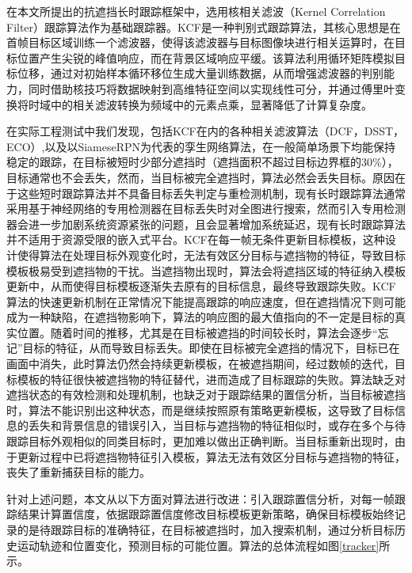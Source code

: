 
在本文所提出的抗遮挡长时跟踪框架中，选用核相关滤波（Kernel Correlation Filter）跟踪算法作为基础跟踪器。KCF是一种判别式跟踪算法，其核心思想是在首帧目标区域训练一个滤波器，使得该滤波器与目标图像块进行相关运算时，在目标位置产生尖锐的峰值响应，而在背景区域响应平缓。该算法利用循环矩阵模拟目标位移，通过对初始样本循环移位生成大量训练数据，从而增强滤波器的判别能力，同时借助核技巧将数据映射到高维特征空间以实现线性可分，并通过傅里叶变换将时域中的相关滤波转换为频域中的元素点乘，显著降低了计算复杂度。

在实际工程测试中我们发现，包括KCF在内的各种相关滤波算法（DCF，DSST，ECO）,以及以SiameseRPN为代表的孪生网络算法，在一般简单场景下均能保持稳定的跟踪，在目标被短时少部分遮挡时（遮挡面积不超过目标边界框的30\%），目标通常也不会丢失，然而，当目标被完全遮挡时，算法必然会丢失目标。原因在于这些短时跟踪算法并不具备目标丢失判定与重检测机制，现有长时跟踪算法通常采用基于神经网络的专用检测器在目标丢失时对全图进行搜索，然而引入专用检测器会进一步加剧系统资源紧张的问题，且会显著增加系统延迟，现有长时跟踪算法并不适用于资源受限的嵌入式平台。KCF在每一帧无条件更新目标模板，这种设计使得算法在处理目标外观变化时，无法有效区分目标与遮挡物的特征，导致目标模板极易受到遮挡物的干扰。当遮挡物出现时，算法会将遮挡区域的特征纳入模板更新中，从而使得目标模板逐渐失去原有的目标信息，最终导致跟踪失败。KCF算法的快速更新机制在正常情况下能提高跟踪的响应速度，但在遮挡情况下则可能成为一种缺陷，在遮挡物影响下，算法的响应图的最大值指向的不一定是目标的真实位置。随着时间的推移，尤其是在目标被遮挡的时间较长时，算法会逐步“忘记”目标的特征，从而导致目标丢失。即使在目标被完全遮挡的情况下，目标已在画面中消失，此时算法仍然会持续更新模板，在被遮挡期间，经过数帧的迭代，目标模板的特征很快被遮挡物的特征替代，进而造成了目标跟踪的失败。算法缺乏对遮挡状态的有效检测和处理机制，也缺乏对于跟踪结果的置信分析，当目标被遮挡时，算法不能识别出这种状态，而是继续按照原有策略更新模板，这导致了目标信息的丢失和背景信息的错误引入，当目标与遮挡物的特征相似时，或存在多个与待跟踪目标外观相似的同类目标时，更加难以做出正确判断。当目标重新出现时，由于更新过程中已将遮挡物特征引入模板，算法无法有效区分目标与遮挡物的特征，丧失了重新捕获目标的能力。

针对上述问题，本文从以下方面对算法进行改进：引入跟踪置信分析，对每一帧跟踪结果计算置信度，依据跟踪置信度修改目标模板更新策略，确保目标模板始终记录的是待跟踪目标的准确特征，在目标被遮挡时，加入搜索机制，通过分析目标历史运动轨迹和位置变化，预测目标的可能位置。算法的总体流程如图\ref{tracker}所示。

